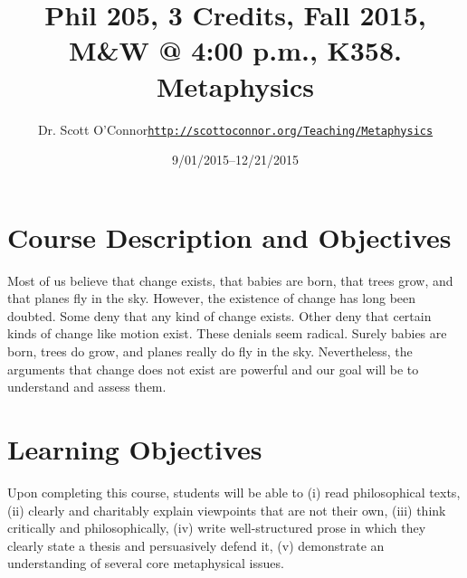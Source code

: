 \documentclass[article,oneside]{memoir}
\makeatletter
\def\myauthor{Author}
\def\mytitle{Title}
\def\mycopyright{\myauthor}
\def\myweb{\href{http://scottoconnor.org/Teaching/Metaphysics}{http://scottoconnor.org/Teaching/Metaphysics}}
\def\myauthor{Dr. Scott O'Connor}
\def\mytitle{{\normalsize Phil 205, 3 Credits, Fall 2015, M\&W @ 4:00 p.m., K358. \newline} \HUGE Metaphysics}
\makeatother
\begin{document}
\setsansfont[Mapping=tex-text]{Georgia} 
\setmonofont[Mapping=tex-text,Scale=0.8]{Georgia} 

\def\ind{\hangindent=1 true cm\hangafter=1 \noindent}
\def\labelitemi{$\cdot$}

\pagestyle{kjh}

\title{\LARGE\mytitle}     
\author{\Large\myauthor \newline \footnotesize\texttt{\noindent\myweb}}
\date{9/01/2015--12/21/2015}

\published{\,}

\maketitle




%
%

\section{Course Description and Objectives}

Most of us believe that change exists, that babies are born, that trees grow, and that planes fly in the sky. However, the existence of change has long been doubted. Some deny that any kind of change exists. Other deny that certain kinds of change like motion exist. These denials seem radical. Surely babies are born, trees do grow, and planes really do fly in the sky. Nevertheless, the arguments that change does not exist are powerful and our goal will be to understand and assess them. 


\section{Learning Objectives}

Upon completing this course, students will be able to (i) read
philosophical texts, (ii) clearly and charitably explain viewpoints that
are not their own, (iii) think critically and philosophically, (iv)
write well-structured prose in which they clearly state a thesis and
persuasively defend it, (v) demonstrate an understanding of several core
metaphysical issues.
\end{document}
